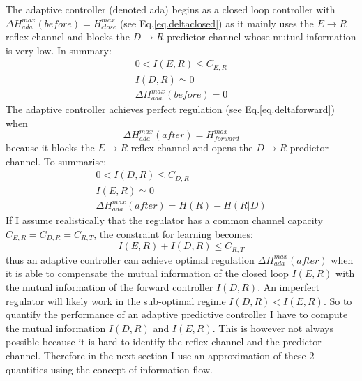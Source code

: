The adaptive controller (denoted ada) begins as a closed loop controller with
$\Delta H^{max}_{ada}(before)=H^{max}_{close}$ (see Eq.\ref{eq.deltaclosed}) as
 it mainly uses the $E\rightarrow R$ reflex channel and blocks the $D \rightarrow R$
predictor channel whose mutual information is very low. In summary:
\begin{eqnarray}
0<I(E,R)\leq C_{E,R}\\
I(D,R)\simeq 0\\
\Delta H^{max}_{ada}(before)=0
\end{eqnarray}
The adaptive controller achieves perfect regulation (see Eq.\ref{eq.deltaforward}) when
\begin{equation}
\Delta H^{max}_{ada}(after)=H^{max}_{forward}
\end{equation}
because it blocks the $E\rightarrow R$ reflex channel and opens the $D\rightarrow R$
 predictor channel. To summarise:
\begin{eqnarray}
0<I(D,R)\leq C_{D,R}\\
I(E,R)\simeq 0\\
\Delta H^{max}_{ada}(after)=H(R)-H(R|D)
\end{eqnarray}
If I assume realistically that the regulator has a common channel capacity
$C_{E,R}=C_{D,R}=C_{R,T}$, the constraint for learning becomes:
\begin{equation}
I(E,R)+I(D,R) \leq C_{R,T}\label{eq.constraint}
\end{equation}
thus an adaptive controller can achieve optimal regulation $\Delta H^{max}_{ada}(after)$
when it is able to compensate the mutual information of the closed loop $I(E,R)$
with the mutual information of the forward controller $I(D,R)$.
An imperfect regulator will likely work in the sub-optimal regime $I(D,R)<I(E,R)$.
So to quantify the performance of an adaptive predictive controller I have to
compute the mutual information $I(D,R)$ and $I(E,R)$.
This is however not always possible because it is hard to identify the reflex
 channel and the predictor channel.
Therefore in the next section I use an approximation of these 2 quantities
using the concept of information flow.

